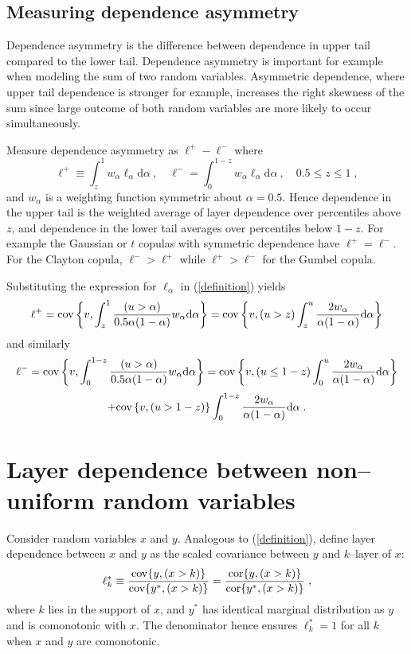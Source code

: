 \documentclass[authoryear]{elsarticle}
\newcommand{\cov}{{\rm cov}}
\newcommand{\cor}{\mathrm{cor}}
\newcommand{\de}{\mathrm{d}}
\newcommand{\cq}{\ ,\quad }
\newcommand{\eref}[1]{(\ref{#1})}
\begin{document}
\subsection{Measuring dependence asymmetry}

Dependence asymmetry is the difference between dependence in upper tail compared to the lower tail. Dependence asymmetry is important for example when modeling the sum of two random variables. Asymmetric dependence, where upper tail dependence is stronger for example, increases the right skewness of the sum since large outcome of both random variables are more likely to occur simultaneously.

Measure dependence asymmetry as $\ell^+-\ell^-$ where
$$
 \ell^+ \equiv \int_z^1 w_\alpha\ell_\alpha \de \alpha
\cq \ell^- = \int_0^{1-z} w_\alpha\ell_\alpha \de \alpha
\cq 0.5\leq z\leq 1\;,
$$
and $w_\alpha$ is a weighting function symmetric about $\alpha=0.5$. Hence dependence in the upper tail is the weighted average of layer dependence over percentiles above $z$, and dependence in the lower tail averages over percentiles below $1-z$. For example the Gaussian or $t$ copulas with symmetric dependence have $\ell^+=\ell^-$. For the Clayton copula, $\ell^->\ell^+$ while $\ell^+>\ell^-$ for the Gumbel copula.

Substituting the expression for $\ell_\alpha$ in \eref{definition} yields
$$
\ell^+
= \cov\left\{ v, \int_z^1 \frac{(u>\alpha)}{0.5\alpha(1-\alpha)} w_\alpha \de \alpha\right\}
=\cov\left\{v,(u>z)\int_z^u \frac{2w_\alpha}{\alpha(1-\alpha)} \de \alpha\right\}
$$
and similarly
$$
\ell^- =  \cov\left\{ v, \int_0^{1-z} \frac{(u>\alpha)}{0.5\alpha(1-\alpha)} w_\alpha \de \alpha\right\}
=\cov\left\{ v, (u\leq 1-z) \int_0^u \frac{2w_\alpha}{\alpha(1-\alpha)} \de \alpha \right\}
$$
$$
+\cov\left\{ v, (u> 1-z)  \right\} \int_0^{1-z}\frac{2w_\alpha}{\alpha(1-\alpha)} \de \alpha \;.
$$




\section{Layer dependence between non--uniform random variables}\label{soriginal}


Consider random variables $x$ and $y$.  Analogous to \eref{definition}, define layer dependence between $x$ and $y$ as the scaled covariance between $y$ and $k$--layer of $x$:
$$
\ell_k^* \equiv \frac{\cov\{y,(x>k)\}}{\cov\{y^*,(x>k)\}} = \frac{\cor\{y,(x>k)\}}{\cor\{y^*,(x>k)\}}\;,
$$
where $k$ lies in the support of $x$, and $y^*$ has identical marginal distribution as $y$ and is comonotonic with $x$. The denominator hence ensures $\ell_k^*=1$ for all $k$ when $x$ and $y$ are comonotonic.
\end{document}
